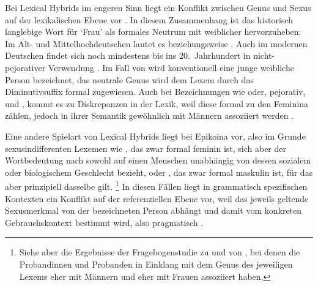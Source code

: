Bei Lexical Hybrids im engeren Sinn liegt ein Konflikt
zwischen Genus und Sexus auf der lexikalischen Ebene vor
\autocite[145]{klein2022}. In diesem Zusammenhang ist das
historisch langlebige Wort für `Frau' als formales Neutrum mit
weiblicher  hervorzuheben: Im Alt- und
Mittelhochdeutschen lautet es  beziehungsweise
. Auch im modernen Deutschen findet sich 
noch mindestens bis ins 20.~Jahrhundert in nicht-pejorativer Verwendung
\autocite[166]{fleischer2012}. Im Fall von  wird
konventionell eine junge weibliche Person bezeichnet, das
neutrale Genus wird dem Lexem durch das Diminutivsuffix  formal
zugewiesen. Auch bei Bezeichnungen wie  oder, pejorativ,  und , kommt es zu Diskrepanzen in der Lexik, weil diese
formal zu den Feminina zählen, jedoch in ihrer Semantik gewöhnlich mit Männern
assoziiert werden \autocite[vgl.~auch][67--68]{panther2009}.

\label{phsec:epikoina}

Eine andere Spielart von Lexical Hybrids liegt bei Epikoina vor, also im Grunde
sexus\-indifferenten Lexemen wie , das zwar formal feminin ist, sich
aber der Wortbedeutung nach sowohl auf einen Menschen unabhängig von dessen
sozialem oder biologischem Geschlecht bezieht, oder
, das zwar formal maskulin ist, für das aber prinzipiell dasselbe
gilt.%
%
	\footnote{Siehe aber die Ergebnisse der Fragebogenstudie zu
		 und  von \citet[174--183]{klein2022}, bei denen
		die Probandinnen und Probanden in Einklang mit dem Genus des jeweiligen
		Lexems  eher mit Männern und  eher mit Frauen
		assoziiert haben.}
%
In diesen Fällen liegt in grammatisch spezifischen Kontexten ein Konflikt auf
der referenziellen Ebene vor, weil das jeweils geltende Sexusmerkmal von der
bezeichneten Person abhängt und damit vom konkreten Gebrauchskontext bestimmt
wird, also pragmatisch \autocite[142--144]{klein2022}.

